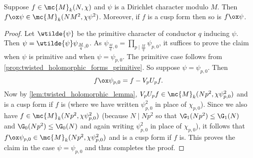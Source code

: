     \begin{proposition}\label{prop:twisted_holomorphic_forms}
      Suppose $f \in \mc{M}_{k}(N,\chi)$ and $\psi$ is a Dirichlet character modulo $M$. Then $f \ox \psi \in \mc{M}_{k}(NM^{2},\chi\psi^{2})$. Moreover, if $f$ is a cusp form then so is $f \ox \psi$.
    \end{proposition}
    \begin{proof}
      Let $\wtilde{\psi}$ be the primitive character of conductor $q$ inducing $\psi$. Then $\psi = \wtilde{\psi}\psi_{\frac{M}{q},0}$. As $\psi_{\frac{M}{q},0} = \prod_{p \mid \frac{M}{q}}\psi_{p,0}$, it suffices to prove the claim when $\psi$ is primitive and when $\psi = \psi_{p,0}$. The primitive case follows from \cref{prop:twisted_holomorphic_forms_primitive}. So suppose $\psi = \psi_{p,0}$. Then
      \[
        f \ox \psi_{p,0} = f-V_{p}U_{p}f.
      \]
      Now by \cref{lem:twisted_holomorphic_lemma}, $V_{p}U_{p}f \in \mc{M}_{k}(Np^{2},\chi\psi_{p,0}^{2})$ and is a cusp form if $f$ is (where we have written $\psi_{p,0}^{2}$ in place of $\chi_{p,0}$). Since we also have $f \in \mc{M}_{k}(Np^{2},\chi\psi_{p,0}^{2})$ (because $N \mid Np^{2}$ so that $\G_{1}(Np^{2}) \le \G_{1}(N)$ and $\G_{0}(Np^{2}) \le \G_{0}(N)$ and again writing $\psi_{p,0}^{2}$ in place of $\chi_{p,0}$), it follows that $f \ox \psi_{p,0} \in \mc{M}_{k}(Np^{2},\chi\psi_{p,0}^{2})$ and is a cusp form if $f$ is. This proves the claim in the case $\psi = \psi_{p,0}$ and thus completes the proof.
    \end{proof}